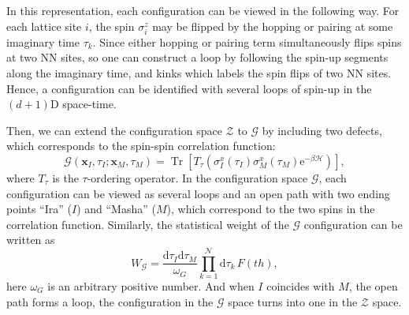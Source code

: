\documentclass{article}
\DeclareMathOperator{\Tr}{Tr}
\theoremstyle{plain} \newtheorem{thm}{Theorem}[section]
\theoremstyle{definition} \newtheorem{df}{Definition}[section]
\theoremstyle{definition} \newtheorem{eg}{Example}
\theoremstyle{remark} \newtheorem*{rmk}{Remark}
\begin{document}
In this representation, each configuration can be viewed in the following way. For each lattice site $i$, the spin $\sigma_i^z$ may be flipped by the hopping or pairing at some imaginary time $\tau_k$. Since either hopping or pairing term simultaneously flips spins at two NN sites, so one can construct a loop by following the spin-up segments along the imaginary time, and kinks which labels the spin flips of two NN sites. Hence, a configuration can be identified with several loops of spin-up in the $(d+1)$D space-time.

Then, we can extend the configuration space $\mathcal{Z}$ to $\mathcal{G}$ by including two defects, which corresponds to the spin-spin correlation function:
\begin{equation}
  \mathcal{G}(\bm{x}_I, \tau_I; \bm{x}_M, \tau_M) = \Tr\left[ T_\tau\left( \sigma_I^x(\tau_I)\sigma_M^x(\tau_M)\mathrm{e}^{-\beta\mathcal{H}} \right) \right],
\end{equation}
where $T_\tau$ is the $\tau$-ordering operator. In the configuration space $\mathcal{G}$, each configuration can be viewed as several loops and an open path with two ending points ``Ira'' ($I$) and ``Masha'' ($M$), which correspond to the two spins in the correlation function. Similarly, the statistical weight of the $\mathcal{G}$ configuration can be written as
\begin{equation}
  W_\mathcal{G} = \frac{\mathrm{d}\tau_I\mathrm{d}\tau_M}{\omega_G} \prod_{k=1}^{\mathcal{N}}\mathrm{d}\tau_k\,F(t h),
\end{equation}
here $\omega_G$ is an arbitrary positive number. And when $I$ coincides with $M$, the open path forms a loop, the configuration in the $\mathcal{G}$ space turns into one in the $\mathcal{Z}$ space.
\end{document}
